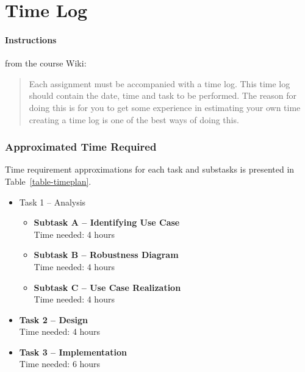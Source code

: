 %
%
%
%


\section{Time Log}\label{time-log}

\paragraph{Instructions}\label{time-log-instructions}
from the course Wiki\cite{1dv600:lab1:instructions}:

\begin{quote}
  Each assignment must be accompanied with a time log. This time log should
  contain the date, time and task to be performed. The reason for doing this is
  for you to get some experience in estimating your own time creating a time
  log is one of the best ways of doing this.
\end{quote}


\subsubsection{Approximated Time Required}\label{approximated-time-required}
Time requirement approximations for each task and substasks is presented 
in Table~\ref{table-timeplan}.

\begin{itemize}
\item
  Task 1 -- Analysis

  \begin{itemize}
  \item
    \textbf{Subtask A -- Identifying Use Case}\\
    Time needed: 4 hours
  \item
    \textbf{Subtask B -- Robustness Diagram}\\
    Time needed: 4 hours
  \item
    \textbf{Subtask C -- Use Case Realization}\\
    Time needed: 4 hours
  \end{itemize}
\item
  \textbf{Task 2 -- Design}\\
  Time needed: 4 hours
\item
  \textbf{Task 3 -- Implementation}\\
  Time needed: 6 hours
\end{itemize}

